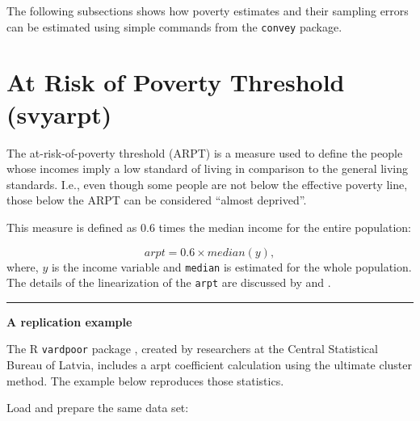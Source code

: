 \documentclass[]{book}
\begin{document}
The following subsections shows how poverty estimates and their sampling errors can be estimated using simple commands from the \texttt{convey} package.

\hypertarget{at-risk-of-poverty-threshold-svyarpt}{%
\section{At Risk of Poverty Threshold (svyarpt)}\label{at-risk-of-poverty-threshold-svyarpt}}

The at-risk-of-poverty threshold (ARPT) is a measure used to define the people whose incomes imply a low standard of living in comparison to the general living standards. I.e., even though some people are not below the effective poverty line, those below the ARPT can be considered ``almost deprived''.

This measure is defined as \(0.6\) times the median income for the entire population:

\[
arpt = 0.6 \times median(y),
\]
where, \(y\) is the income variable and \texttt{median} is estimated for the whole population. The details of the linearization of the \texttt{arpt} are discussed by \citet{deville1999} and \citet{osier2009}.

\begin{center}\rule{0.5\linewidth}{0.5pt}\end{center}

\textbf{A replication example}

The R \texttt{vardpoor} package \citep{vardpoor}, created by researchers at the Central Statistical Bureau of Latvia, includes a arpt coefficient calculation using the ultimate cluster method. The example below reproduces those statistics.

Load and prepare the same data set:
\end{document}
